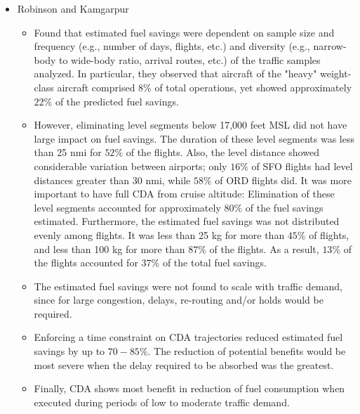 \documentclass{aer1315-pretty}
\begin{document}
\begin{itemize}
\item Robinson and Kamgarpur \cite{Rob:2010} 
\begin{itemize}
\item Found that estimated fuel savings were dependent on sample size and frequency (e.g., number of days, flights, etc.) and diversity (e.g., narrow-body to wide-body ratio, arrival routes, etc.) of the traffic samples analyzed.  In particular, they observed that aircraft of the "heavy" weight-class aircraft comprised $8\%$ of total operations, yet showed approximately $22\%$ of the predicted fuel savings.
\item However, eliminating level segments below 17,000 feet MSL did not have large impact on fuel savings. The duration of these level segments was less than 25 nmi for $52\%$ of the flights. Also, the level distance showed considerable variation between airports; only $16\%$ of SFO flights had level distances greater than 30 nmi, while $58\%$ of ORD flights did. 
It was more important to have full CDA from cruise altitude: Elimination of these level segments accounted for approximately $80\%$ of the fuel savings estimated. Furthermore, the estimated fuel savings was not distributed evenly among flights. It was less than 25 kg for more than $45\%$ of flights, and less than 100 kg for more than $87\%$ of the flights. As a result, $13\%$ of the flights accounted for $37\%$ of the total fuel savings.
\item The estimated fuel savings were not found to scale with traffic demand, since for large congestion, delays, re-routing and/or holds would be required. 
\item Enforcing a time constraint on CDA trajectories reduced estimated fuel savings by up to $70-85\%$. The reduction of potential benefits would be most severe when the delay required to be absorbed was the greatest.
\item Finally, CDA shows most benefit in reduction of fuel consumption when executed during periods of low to moderate traffic demand. 
\end{itemize}



\end{itemize}
\end{document}
